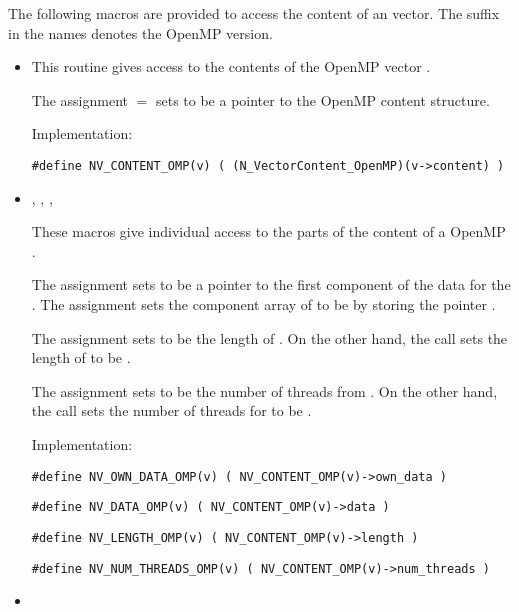 The following macros are provided to access the content of an {\nvecopenmp}
vector. The suffix  in the names denotes the OpenMP version.
\begin{itemize}

\item {}

  This routine gives access to the contents of the OpenMP
  vector .

  The assignment  $=$  sets
   to be a pointer to the OpenMP  content
  structure.

  Implementation:

  \verb|#define NV_CONTENT_OMP(v) ( (N_VectorContent_OpenMP)(v->content) )|

\item {}, , , 


  These macros give individual access to the parts of
  the content of a OpenMP .

  The assignment  sets  to be
  a pointer to the first component of the data for the  .
  The assignment  sets the component array of  to
  be  by storing the pointer .

  The assignment  sets  to be
  the length of . On the other hand, the call 
  sets the length of  to be .

  The assignment  sets  to be
  the number of threads from . On the other hand, the call 
  sets the number of threads for  to be .

  Implementation:

  \verb|#define NV_OWN_DATA_OMP(v) ( NV_CONTENT_OMP(v)->own_data )|

  \verb|#define NV_DATA_OMP(v) ( NV_CONTENT_OMP(v)->data )|

  \verb|#define NV_LENGTH_OMP(v) ( NV_CONTENT_OMP(v)->length )|

  \verb|#define NV_NUM_THREADS_OMP(v) ( NV_CONTENT_OMP(v)->num_threads )|

\item {}


\end{itemize}
